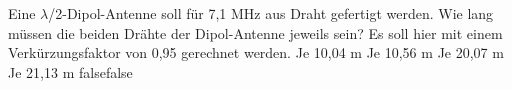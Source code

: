     {Eine $\lambda$/2-Dipol-Antenne soll für 7,1 MHz aus Draht gefertigt werden. Wie lang müssen die beiden Drähte der Dipol-Antenne jeweils sein? Es soll hier mit einem Verkürzungsfaktor von 0,95 gerechnet werden.}
    {Je 10,04 m}
    {Je 10,56 m}
    {Je 20,07 m}
    {Je 21,13 m}
    {false}{false}